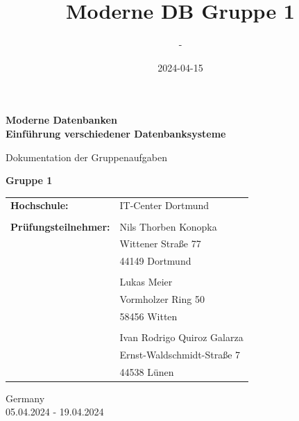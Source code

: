 \documentclass[11pt,a4paper]{article}
\title{Moderne DB Gruppe 1}
\date{2024-04-15}
\author{-}
\begin{document}
	\begin{titlepage}
		\begin{center}
			\vspace*{1cm}
			
			\Huge
			\textbf{Moderne Datenbanken\\ Einführung verschiedener Datenbanksysteme}
			
			\vspace{0.5cm}
			\LARGE
			Dokumentation der Gruppenaufgaben
			
			\vspace{1.5cm}
			
			\textbf{Gruppe 1}
			
			\vspace{1.75cm}
			
			\vfill
			
			\vspace{1.0cm}
			
			\large
			\begin{tabular}{p{8cm}l}
				\textbf{Hochschule:} & IT-Center Dortmund\\ 
				&\\
				\textbf{Prüfungsteilnehmer:} & Nils Thorben Konopka\\
				& Wittener Straße 77\\
				& 44149 Dortmund\\
				&\\
				& Lukas Meier\\
				& Vormholzer Ring 50\\
				& 58456 Witten\\
				&\\
				& Ivan Rodrigo Quiroz Galarza\\
				& Ernst-Waldschmidt-Straße 7\\
				& 44538 Lünen
			\end{tabular}
			
			\vspace{2.0cm}
			
			\Large
			\vspace{0.20cm}
			Germany\\
			05.04.2024 - 19.04.2024
			
		\end{center}
	\end{titlepage}
	
	\newpage
	
	\setcounter{tocdepth}{2}
	\setcounter{secnumdepth}{3}
	\tableofcontents
	
	
	
	
	
	
	
	
	
\end{document}
